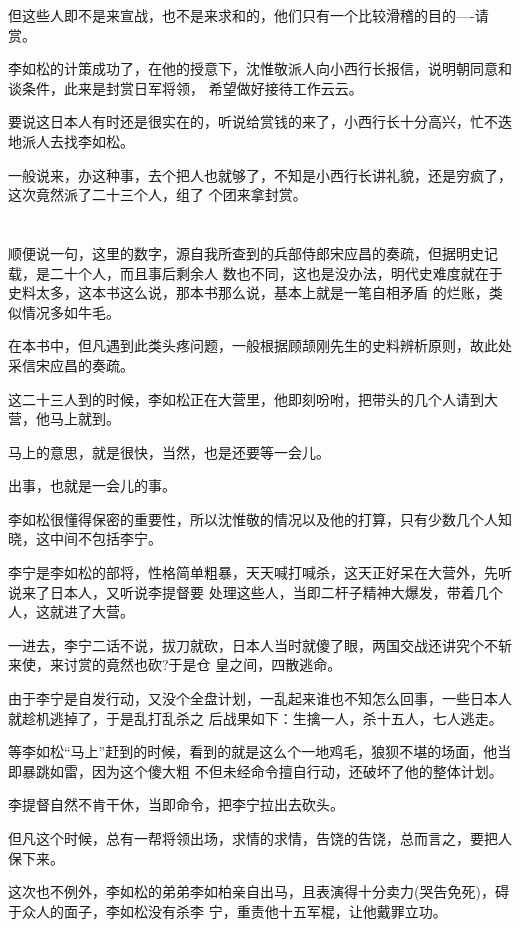 \documentclass[11pt,a4paper,onecolumn]{article}
\begin{document}
但这些人即不是来宣战，也不是来求和的，他们只有一个比较滑稽的目的----请赏。

李如松的计策成功了，在他的授意下，沈惟敬派人向小西行长报信，说明朝同意和谈条件，此来是封赏日军将领，
希望做好接待工作云云。

要说这日本人有时还是很实在的，听说给赏钱的来了，小西行长十分高兴，忙不迭地派人去找李如松。

一般说来，办这种事，去个把人也就够了，不知是小西行长讲礼貌，还是穷疯了，这次竟然派了二十三个人，组了
个团来拿封赏。

\section[\thesection]{}

顺便说一句，这里的数字，源自我所查到的兵部侍郎宋应昌的奏疏，但据明史记载，是二十个人，而且事后剩余人
数也不同，这也是没办法，明代史难度就在于史料太多，这本书这么说，那本书那么说，基本上就是一笔自相矛盾
的烂账，类似情况多如牛毛。

在本书中，但凡遇到此类头疼问题，一般根据顾颉刚先生的史料辨析原则，故此处采信宋应昌的奏疏。

这二十三人到的时候，李如松正在大营里，他即刻吩咐，把带头的几个人请到大营，他马上就到。

马上的意思，就是很快，当然，也是还要等一会儿。

出事，也就是一会儿的事。

李如松很懂得保密的重要性，所以沈惟敬的情况以及他的打算，只有少数几个人知晓，这中间不包括李宁。

李宁是李如松的部将，性格简单粗暴，天天喊打喊杀，这天正好呆在大营外，先听说来了日本人，又听说李提督要
处理这些人，当即二杆子精神大爆发，带着几个人，这就进了大营。

一进去，李宁二话不说，拔刀就砍，日本人当时就傻了眼，两国交战还讲究个不斩来使，来讨赏的竟然也砍?于是仓
皇之间，四散逃命。

由于李宁是自发行动，又没个全盘计划，一乱起来谁也不知怎么回事，一些日本人就趁机逃掉了，于是乱打乱杀之
后战果如下：生擒一人，杀十五人，七人逃走。

等李如松``马上''赶到的时候，看到的就是这么个一地鸡毛，狼狈不堪的场面，他当即暴跳如雷，因为这个傻大粗
不但未经命令擅自行动，还破坏了他的整体计划。

李提督自然不肯干休，当即命令，把李宁拉出去砍头。

但凡这个时候，总有一帮将领出场，求情的求情，告饶的告饶，总而言之，要把人保下来。

这次也不例外，李如松的弟弟李如柏亲自出马，且表演得十分卖力(哭告免死)，碍于众人的面子，李如松没有杀李
宁，重责他十五军棍，让他戴罪立功。
\end{document}
